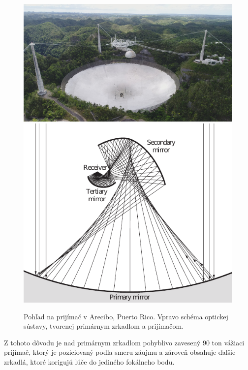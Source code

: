 \begin{figure}
    \includegraphics[scale=0.12]{obrazky-figures/areciboSite.jpg}
    \includegraphics[scale=0.65]{obrazky-figures/arecibo.pdf}
    \caption{Pohľad na prijímač v Arecibo, Puerto Rico. Vpravo schéma optickej sústavy, tvorenej
    primárnym zrkadlom a prijímačom.}
\end{figure}


Z tohoto dôvodu je nad primárnym zrkadlom pohyblivo zavesený 90 ton vážiaci prijímač, ktorý je poziciovaný
podľa smeru záujmu a zároveň obsahuje ďalšie zrkadlá, ktoré korigujú lúče do jediného fokálneho
bodu\cite{hechtoptics}.

